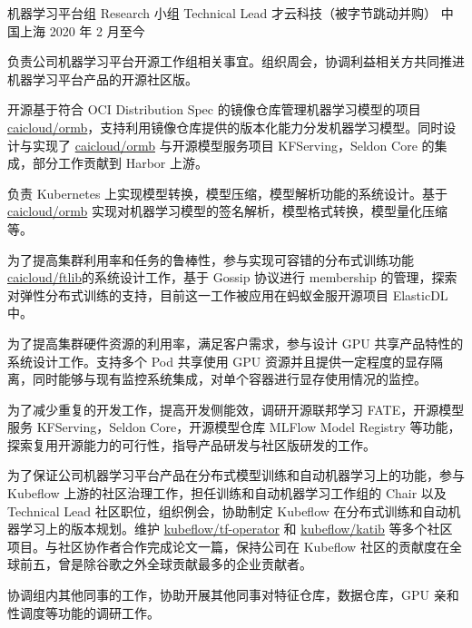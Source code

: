 \begin{cventries}
  \cventry
    {机器学习平台组 Research 小组 Technical Lead} %
    {才云科技（被字节跳动并购）} %
    {中国上海} %
    {2020 年 2 月至今} %
    {
      \begin{cvitems} %
        \item 负责公司机器学习平台开源工作组相关事宜。组织周会，协调利益相关方共同推进机器学习平台产品的开源社区版。
        \item 开源基于符合 OCI Distribution Spec 的镜像仓库管理机器学习模型的项目 \href{https://github.com/caicloud/ormb}{caicloud/ormb}，支持利用镜像仓库提供的版本化能力分发机器学习模型。同时设计与实现了 \href{https://github.com/caicloud/ormb}{caicloud/ormb} 与开源模型服务项目 KFServing，Seldon Core 的集成，部分工作贡献到 Harbor 上游。
        \item 负责 Kubernetes 上实现模型转换，模型压缩，模型解析功能的系统设计。基于 \href{https://github.com/caicloud/ormb}{caicloud/ormb} 实现对机器学习模型的签名解析，模型格式转换，模型量化压缩等。
        \item 为了提高集群利用率和任务的鲁棒性，参与实现可容错的分布式训练功能 \href{https://github.com/caicloud/ftlib}{caicloud/ftlib}的系统设计工作，基于 Gossip 协议进行 membership 的管理，探索对弹性分布式训练的支持，目前这一工作被应用在蚂蚁金服开源项目 ElasticDL 中。
        \item 为了提高集群硬件资源的利用率，满足客户需求，参与设计 GPU 共享产品特性的系统设计工作。支持多个 Pod 共享使用 GPU 资源并且提供一定程度的显存隔离，同时能够与现有监控系统集成，对单个容器进行显存使用情况的监控。
        \item 为了减少重复的开发工作，提高开发侧能效，调研开源联邦学习 FATE，开源模型服务 KFServing，Seldon Core，开源模型仓库 MLFlow Model Registry 等功能，探索复用开源能力的可行性，指导产品研发与社区版研发的工作。
        \item 为了保证公司机器学习平台产品在分布式模型训练和自动机器学习上的功能，参与 Kubeflow 上游的社区治理工作，担任训练和自动机器学习工作组的 Chair 以及 Technical Lead 社区职位，组织例会，协助制定 Kubeflow 在分布式训练和自动机器学习上的版本规划。维护 \href{https://github.com/kubeflow/tf-operator}{kubeflow/tf-operator} 和 \href{https://github.com/kubeflow/katib}{kubeflow/katib} 等多个社区项目。与社区协作者合作完成论文一篇，保持公司在 Kubeflow 社区的贡献度在全球前五，曾是除谷歌之外全球贡献最多的企业贡献者。
        \item 协调组内其他同事的工作，协助开展其他同事对特征仓库，数据仓库，GPU 亲和性调度等功能的调研工作。
      \end{cvitems}
    }


\end{cventries}
